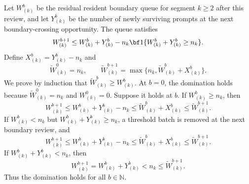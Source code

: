 Let \(W^b_{(k)}\) be the residual resident boundary queue for segment \(k\ge2\) after this review, and let \(Y^b_{(k)}\) be the number of newly surviving prompts at the next boundary-crossing opportunity. The queue satisfies
\[
    W^{b+1}_{(k)}
    \le
    W^b_{(k)}+Y^b_{(k)}
    -
    n_k{\bf 1}\{W^b_{(k)}+Y^b_{(k)}\ge n_k\}.
\]
Define \(X^b_{(k)}=Y^b_{(k)}-n_k\) and
\[
    \tilde{W}_{(k)}^0=n_k,\qquad
    \tilde{W}_{(k)}^{b+1}
    =
    \max\{n_k,\tilde{W}_{(k)}^b+X^b_{(k)}\}.
\]
We prove by induction that \(\tilde{W}^b_{(k)}\ge W^b_{(k)}\). At \(b=0\), the domination holds because \(\tilde W^0_{(k)}=n_k\) and \(W^0_{(k)}=0\). Suppose it holds at \(b\). If \(W^b_{(k)}\ge n_k\), then
\[
    W^{b+1}_{(k)}
    \le W^b_{(k)}+Y^b_{(k)}-n_k
    \le \tilde{W}^b_{(k)}+X^b_{(k)}
    \le \tilde{W}^{b+1}_{(k)}.
\]
If \(W^b_{(k)}<n_k\) but \(W^b_{(k)}+Y^b_{(k)}\ge n_k\), a threshold batch is removed at the next boundary review, and
\[
    W^{b+1}_{(k)}
    \le W^b_{(k)}+Y^b_{(k)}-n_k
    \le \tilde{W}^b_{(k)}+X^b_{(k)}
    \le \tilde{W}^{b+1}_{(k)}.
\]
If \(W^b_{(k)}+Y^b_{(k)}<n_k\), then
\[
    W^{b+1}_{(k)}=W^b_{(k)}+Y^b_{(k)}<n_k\le\tilde{W}^{b+1}_{(k)}.
\]
Thus the domination holds for all \(b\in\mathbb{N}\).

